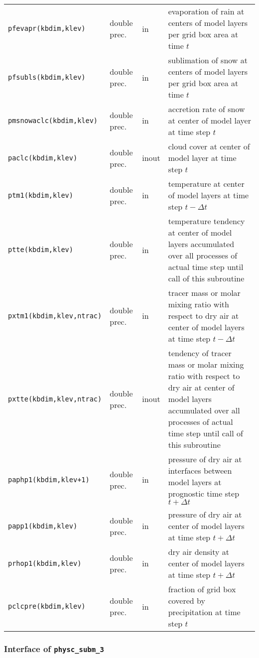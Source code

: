 \begin{longtable}{l@{\extracolsep\fill}llp{7.0cm}}
{\tt pfevapr(kbdim,klev)} & double prec. & in & evaporation of rain at
centers of model layers per grid box area at time $t$ \\
{\tt pfsubls(kbdim,klev)} & double prec. & in & sublimation of snow at
centers of model layers per grid box area at time $t$ \\
{\tt pmsnowaclc(kbdim,klev)} & double prec. & in & accretion rate of
snow at center of
model layer at time step $t$\\
{\tt paclc(kbdim,klev)} & double prec. & inout & cloud cover at center of
model layer at time step $t$\\
{\tt ptm1(kbdim,klev)} & double prec. & in & temperature at center of
model layers at time step $t-\Delta t$\\
{\tt ptte(kbdim,klev)}& double prec. & in & temperature tendency at
center of model layers accumulated over all processes of actual time
step until call of this subroutine\\
{\tt pxtm1(kbdim,klev,ntrac)} & double prec. & in & tracer mass or
molar mixing ratio with respect to dry air at center of model layers at
time step $t-\Delta t$\\
{\tt pxtte(kbdim,klev,ntrac)} & double prec. & inout & tendency of tracer
mass or molar mixing ratio with respect to dry air at center of model
layers accumulated over all processes of actual time
step until call of this subroutine \\
{\tt paphp1(kbdim,klev+1)} & double prec. & in & pressure of dry air at
interfaces between model layers at prognostic time step $t+\Delta t$\\
{\tt papp1(kbdim,klev)} & double prec. & in & pressure of dry air at center of model
layers at time step $t+\Delta t$\\
{\tt prhop1(kbdim,klev)} & double prec. & in & dry air density at center of
model layers at time step $t+\Delta t$ \\
{\tt pclcpre(kbdim,klev)} & double prec. & in & fraction of grid box
covered by precipitation at time step $t$ \\
\end{longtable}

\subsubsection{Interface of {\tt physc\_subm\_3}}

